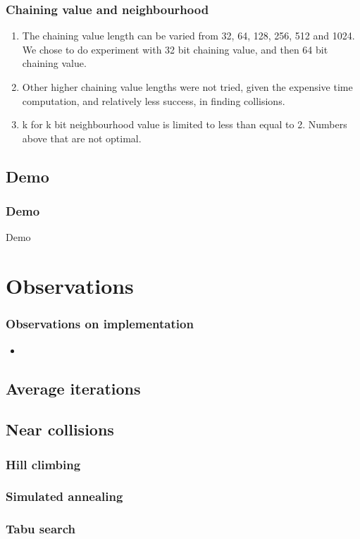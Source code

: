 \documentclass{beamer}
\begin{document}
\begin{frame}
\frametitle{Chaining value and neighbourhood}
\begin{enumerate}
\item The chaining value length can be varied from 32, 64, 128, 256, 512 and 1024. We chose to do experiment
with 32 bit chaining value, and then 64 bit chaining value.
\item Other higher chaining value lengths were not tried, given the expensive time computation, and relatively
less success, in finding collisions.
\item k for k bit neighbourhood value is limited to less than equal to 2. Numbers above that are not optimal. 
\end{enumerate}
\end{frame}

\subsection{Demo}
\begin{frame}
\frametitle{Demo}
Demo
\end{frame}

\section{Observations}

\begin{frame}
\frametitle{Observations on implementation}
\begin{itemize}
\item 
\end{itemize}
\end{frame}

\subsection{Average iterations}
\subsection{Near collisions}

\begin{frame}
\frametitle{Hill climbing}
\end{frame}

\begin{frame}
\frametitle{Simulated annealing}
\end{frame}

\begin{frame}
\frametitle{Tabu search}
\end{frame}
\end{document}
